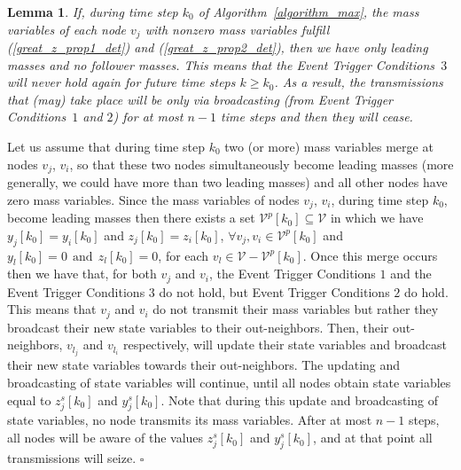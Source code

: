\documentclass[twocolumn]{autart}    %
\newtheorem{lemma}{\bfseries Lemma}
\begin{document}



\begin{lemma}\label{second_lemma}
If, during time step $k_0$ of Algorithm~\ref{algorithm_max}, the mass variables of {\em each} node $v_j$ with nonzero mass variables fulfill (\ref{great_z_prop1_det}) and (\ref{great_z_prop2_det}), then we have only leading masses and no follower masses. 
This means that the Event Trigger Conditions~$3$ will never hold again for future time steps $k \geq k_0$. 
As a result, the transmissions that (may) take place will be only via broadcasting (from Event Trigger Conditions~$1$ and $2$) for at most $n-1$ time steps and then they will cease. 
\end{lemma}

\begin{pf}
Let us assume that during time step $k_0$ two (or more) mass variables merge at nodes $v_j$, $v_i$, so that these two nodes simultaneously become leading masses (more generally, we could have more than two leading masses) and all other nodes have zero mass variables. 
Since the mass variables of nodes $v_j$, $v_i$, during time step $k_0$, become leading masses then there exists a set $\mathcal{V}^p[k_0] \subseteq \mathcal{V}$ in which we have $y_j[k_0] = y_i[k_0]$ and $z_j[k_0] = z_i[k_0]$, $\forall v_j, v_i \in \mathcal{V}^p[k_0]$ and $y_l[k_0] = 0  \ \ \text{and} \ \ z_l[k_0] = 0$, for each $ v_l \in \mathcal{V} - \mathcal{V}^p[k_0]$.
Once this merge occurs then we have that, for both $v_j$ and $v_i$, the Event Trigger Conditions $1$ and the Event Trigger Conditions $3$ do not hold, but Event Trigger Conditions $2$ do hold. 
This means that $v_j$ and $v_i$ do not transmit their mass variables but rather they broadcast their new state variables to their out-neighbors. 
Then, their out-neighbors, $v_{l_j}$ and $v_{l_i}$ respectively, will update their state variables and broadcast their new state variables towards their out-neighbors. 
The updating and broadcasting of state variables will continue, until all nodes obtain state variables equal to $z^s_j[k_0]$ and $y^s_j[k_0]$. 
Note that during this update and broadcasting of state variables, no node transmits its mass variables. 
After at most $n-1$ steps, all nodes will be aware of the values $z^s_j[k_0]$ and $y^s_j[k_0]$, and at that point all transmissions will seize. \hspace*{\fill} $\square$
\end{pf}
\end{document}
